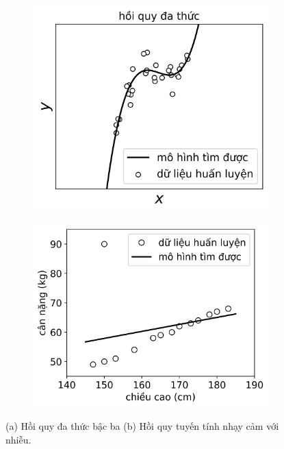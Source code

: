 \begin{figure}[t]
    \begin{subfigure}{0.49\textwidth}
    \includegraphics[width=0.99\linewidth]{Chapters/03_SimpleML/3_linearregression/polyreg.png}
    \caption{}
    \label{fig:3_lra}
    \end{subfigure}
    \begin{subfigure}{0.49\textwidth}
    \includegraphics[width=0.99\linewidth]{ebookML_src/src/linear_regression/noise.png}
    \caption{}
    \label{fig:3_lrb}
    \end{subfigure}
    \caption{ (a) Hồi quy đa thức bậc ba (b) Hồi quy tuyến tính nhạy cảm với nhiễu. 
    }
    \label{fig:3_lr}
\end{figure}



